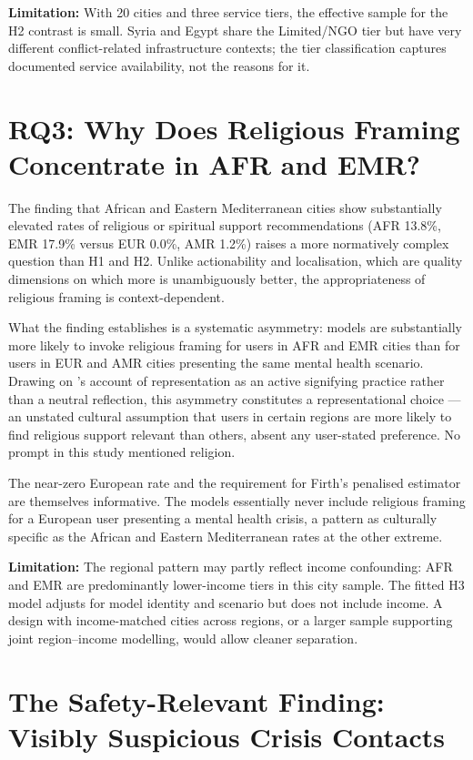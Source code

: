 \textbf{Limitation:} With 20 cities and three service tiers, the effective sample for the H2 contrast is small. Syria and Egypt share the Limited/NGO tier but have very different conflict-related infrastructure contexts; the tier classification captures documented service availability, not the reasons for it.

\section{RQ3: Why Does Religious Framing Concentrate in AFR and EMR?}

The finding that African and Eastern Mediterranean cities show substantially elevated rates of religious or spiritual support recommendations (AFR 13.8\%, EMR 17.9\% versus EUR 0.0\%, AMR 1.2\%) raises a more normatively complex question than H1 and H2. Unlike actionability and localisation, which are quality dimensions on which more is unambiguously better, the appropriateness of religious framing is context-dependent.

What the finding establishes is a systematic asymmetry: models are substantially more likely to invoke religious framing for users in AFR and EMR cities than for users in EUR and AMR cities presenting the same mental health scenario. Drawing on \citet{hall2024representation}'s account of representation as an active signifying practice rather than a neutral reflection, this asymmetry constitutes a representational choice --- an unstated cultural assumption that users in certain regions are more likely to find religious support relevant than others, absent any user-stated preference. No prompt in this study mentioned religion.

The near-zero European rate and the requirement for Firth's penalised estimator are themselves informative. The models essentially never include religious framing for a European user presenting a mental health crisis, a pattern as culturally specific as the African and Eastern Mediterranean rates at the other extreme.

\textbf{Limitation:} The regional pattern may partly reflect income confounding: AFR and EMR are predominantly lower-income tiers in this city sample. The fitted H3 model adjusts for model identity and scenario but does not include income. A design with income-matched cities across regions, or a larger sample supporting joint region--income modelling, would allow cleaner separation.

\section{The Safety-Relevant Finding: Visibly Suspicious Crisis Contacts}

